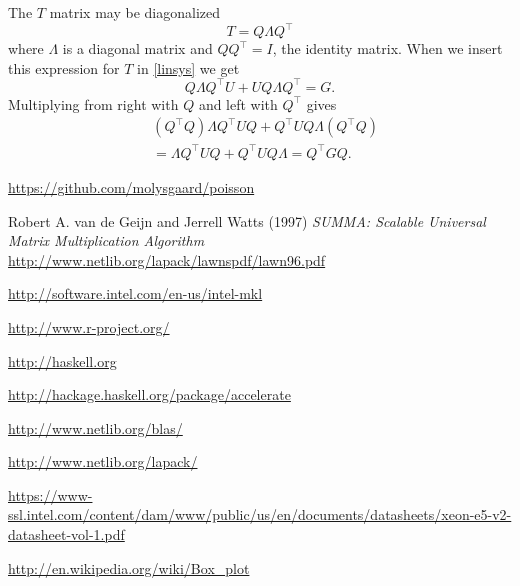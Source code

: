 \documentclass{article}
\begin{document}
The $T$ matrix may be diagonalized
\[
T = Q \Lambda Q^\top
\]
where $\Lambda$ is a diagonal matrix and $Q Q^\top=I$, the identity matrix.
When we insert this expression for $T$ in \eqref{linsys} we get
\[
Q \Lambda Q^\top U + U Q \Lambda Q^\top = G.
\]
Multiplying from right with $Q$ and left with $Q^\top$ gives
\begin{align*}
&(Q^\top Q) \Lambda Q^\top U Q + Q^\top U Q \Lambda (Q^\top Q)\\
&= \Lambda Q^\top U Q + Q^\top U Q \Lambda = Q^\top G Q.
\end{align*}


\begin{thebibliography}{9}

  \url{https://github.com/molysgaard/poisson}

  Robert A. van de Geijn and Jerrell Watts (1997)
  \emph{SUMMA: Scalable Universal Matrix Multiplication Algorithm}
  \url{http://www.netlib.org/lapack/lawnspdf/lawn96.pdf}
 
  \url{http://software.intel.com/en-us/intel-mkl}

  \url{http://www.r-project.org/}

  \url{http://haskell.org}

  \url{http://hackage.haskell.org/package/accelerate}

  \url{http://www.netlib.org/blas/}

  \url{http://www.netlib.org/lapack/}

  \url{https://www-ssl.intel.com/content/dam/www/public/us/en/documents/datasheets/xeon-e5-v2-datasheet-vol-1.pdf}

  \url{http://en.wikipedia.org/wiki/Box_plot}

\end{thebibliography}
\end{document}
